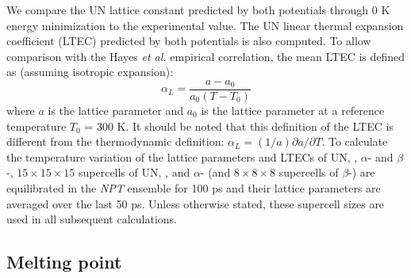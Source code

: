 \documentclass[preprint, 12pt]{elsarticle}
\begin{document}
We compare the UN lattice constant predicted by both potentials through 0 K energy minimization to the experimental value. The UN linear thermal expansion coefficient (LTEC) predicted by both potentials is also computed. To allow comparison with the Hayes \textit{et al.} \cite{Hayes1990I} empirical correlation, the mean LTEC is defined as (assuming isotropic expansion):
\begin{equation}
\alpha_L = \frac{a - a_0}{a_0 \left( T - T_0 \right)}
\end{equation}
where $a$ is the lattice parameter and $a_0$ is the lattice parameter at a reference temperature $T_0$ = 300 K. It should be noted that this definition of the LTEC is different from the thermodynamic definition: $\alpha_L = (1/a) \partial a / \partial T$. To calculate the temperature variation of the lattice parameters and LTECs of UN, , $\alpha$- and $\beta$-, $15 \times 15 \times 15$ supercells of UN, , and $\alpha$- (and $8 \times 8 \times 8$ supercells of $\beta$-) are equilibrated in the \textit{NPT} ensemble for 100 ps and their lattice parameters are averaged over the last 50 ps. Unless otherwise stated, these supercell sizes are used in all subsequent calculations.

\subsection{Melting point}
\end{document}
